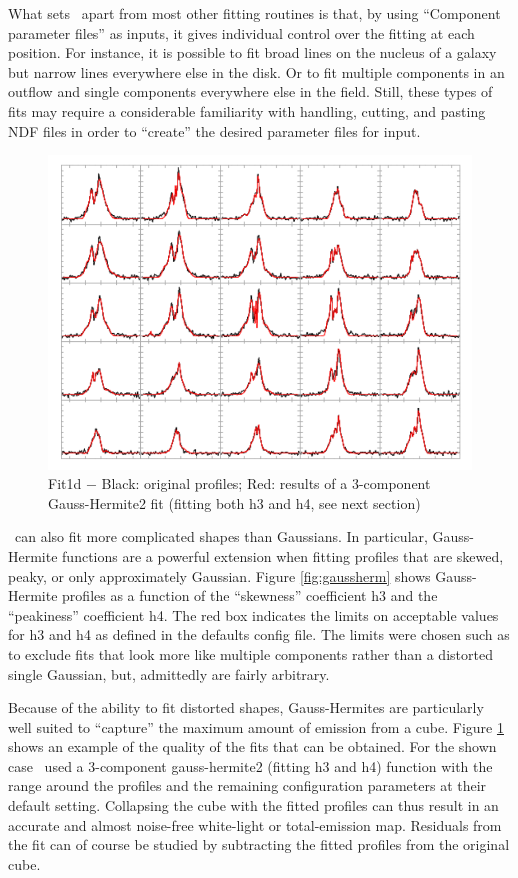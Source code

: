 \documentclass[oneside,11pt]{starlink}
\begin{document}
What sets \fitdd\ apart from most other fitting routines is that, by
using ``Component parameter files'' as inputs, it gives individual
control over the fitting at each position. For instance, it is
possible to fit broad lines on the nucleus of a galaxy but narrow
lines everywhere else in the disk. Or to fit multiple components in an
outflow and single components everywhere else in the field. Still,
these types of fits may require a considerable familiarity with
handling, cutting, and pasting NDF files in order to ``create'' the
desired parameter files for input.

\begin{figure}[htb]
  \begin{center}
    \includegraphics[width=0.8\linewidth]{sun258_fit1d_fits}
    \caption{Fit1d $-$ Black: original profiles; Red: results of a
    3-component Gauss-Hermite2 fit (fitting both h3 and h4, see next section)}
    \label{fig:samplefits}
  \end{center}
\end{figure}

\fitdd\ can also fit more complicated shapes than Gaussians. In
particular, Gauss-Hermite functions are a powerful extension when
fitting profiles that are skewed, peaky, or only approximately
Gaussian. Figure \ref{fig:gaussherm} shows Gauss-Hermite profiles as a
function of the ``skewness'' coefficient h3 and the ``peakiness''
coefficient h4. The red box indicates the limits on acceptable values
for h3 and h4 as defined in the defaults config file. The limits were
chosen such as to exclude fits that look more like multiple components
rather than a distorted single Gaussian, but, admittedly are fairly
arbitrary.

Because of the ability to fit distorted shapes, Gauss-Hermites are
particularly well suited to ``capture'' the maximum amount of emission
from a cube. Figure \ref{fig:samplefits} shows an example of the
quality of the fits that can be obtained. For the shown case \fitdd\
used a 3-component gauss-hermite2 (fitting h3 and h4) function with
the range around the profiles and the remaining configuration
parameters at their default setting.  Collapsing the cube with the
fitted profiles can thus result in an accurate and almost noise-free
white-light or total-emission map. Residuals from the fit can of
course be studied by subtracting the fitted profiles from the original
cube.
\end{document}
